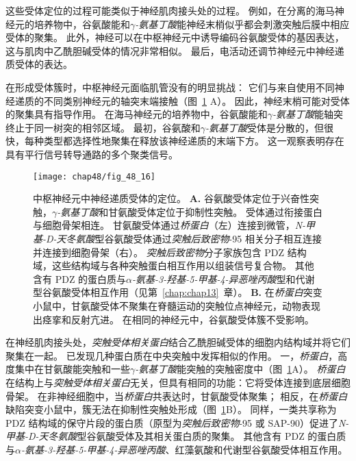 这些受体定位的过程可能类似于神经肌肉接头处的过程。
例如，在分离的海马神经元的培养物中，谷氨酸能和\textit{$ \gamma $-氨基丁酸}能神经末梢似乎都会刺激突触后膜中相应受体的聚集。
此外，神经可以在中枢神经元中诱导编码谷氨酸受体的基因表达，这与肌肉中乙酰胆碱受体的情况非常相似。
最后，电活动还调节神经元中神经递质受体的表达。


在形成受体簇时，中枢神经元面临肌管没有的明显挑战：
它们与来自使用不同神经递质的不同类别神经元的轴突末端接触（图~\ref{fig:48_16} A）。
因此，神经末梢可能对受体的聚集具有指导作用。
在海马神经元的培养物中，谷氨酸能和\textit{$ \gamma $-氨基丁酸}能轴突终止于同一树突的相邻区域。
最初，谷氨酸和\textit{$ \gamma $-氨基丁酸}受体是分散的，但很快，每种类型都选择性地聚集在释放该神经递质的末端下方。
这一观察表明存在具有平行信号转导通路的多个聚类信号。


\begin{figure}[htbp]
	\centering
	\texttt{[image: chap48/fig\_48\_16]}
	\caption{中枢神经元中神经递质受体的定位。
		\textbf{A.} 谷氨酸受体定位于兴奋性突触，\textit{$ \gamma $-氨基丁酸}和甘氨酸受体定位于抑制性突触。
		受体通过衔接蛋白与细胞骨架相连。
		甘氨酸受体通过\textit{桥蛋白}（左）连接到微管，\textit{N-甲基-D-天冬氨酸}型谷氨酸受体通过\textit{突触后致密物}-95 相关分子相互连接并连接到细胞骨架（右）。
		\textit{突触后致密物}分子家族包含 PDZ 结构域，这些结构域与各种突触蛋白相互作用以组装信号复合物。
		其他含有 PDZ 的蛋白质与\textit{$\alpha$-氨基-3-羟基-5-甲基-4-异恶唑丙酸}型和代谢型谷氨酸受体相互作用（见第~\ref{chap:chap13}~章）。
		\textbf{B.} 在\textit{桥蛋白}突变小鼠中，甘氨酸受体不聚集在脊髓运动的突触位点神经元，动物表现出痉挛和反射亢进。
		在相同的神经元中，谷氨酸受体簇不受影响\cite{feng1998dual}。}
	\label{fig:48_16}
\end{figure}


在神经肌肉接头处，\textit{突触受体相关蛋白}结合乙酰胆碱受体的细胞内结构域并将它们聚集在一起。
已发现几种蛋白质在中央突触中发挥相似的作用。
一，\textit{桥蛋白}，高度集中在甘氨酸能突触和一些\textit{$ \gamma $-氨基丁酸}能突触的突触密度中（图~\ref{fig:48_16}A）。
\textit{桥蛋白}在结构上与\textit{突触受体相关蛋白}无关，但具有相同的功能：它将受体连接到底层细胞骨架。
在非神经细胞中，当\textit{桥蛋白}共表达时，甘氨酸受体聚集；
相反，在\textit{桥蛋白}缺陷突变小鼠中，簇无法在抑制性突触处形成（图~\ref{fig:48_16}B）。
同样，一类共享称为 PDZ 结构域的保守片段的蛋白质（原型为\textit{突触后致密物}-95 或 SAP-90）促进了\textit{N-甲基-D-天冬氨酸}型谷氨酸受体及其相关蛋白质的聚集。
其他含有 PDZ 的蛋白质与\textit{$\alpha$-氨基-3-羟基-5-甲基-4-异恶唑丙酸}、红藻氨酸和代谢型谷氨酸受体相互作用。



